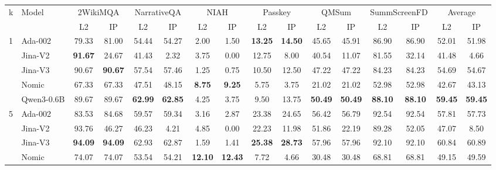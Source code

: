 \begin{sidewaystable}[htbp!]
\centering
\footnotesize
{}
\label{tab:detailed_nDCG}
\begin{tabular}{llcccccccccccccc}
\toprule
\multirow{2}{*}{k} & \multirow{2}{*}{Model} & \multicolumn{2}{c}{2WikiMQA} & \multicolumn{2}{c}{NarrativeQA} & \multicolumn{2}{c}{NIAH} & \multicolumn{2}{c}{Passkey} & \multicolumn{2}{c}{QMSum} & \multicolumn{2}{c}{SummScreenFD} & \multicolumn{2}{c}{Average} \\
\cmidrule(lr){3-4} \cmidrule(lr){5-6} \cmidrule(lr){7-8} \cmidrule(lr){9-10} \cmidrule(lr){11-12} \cmidrule(lr){13-14} \cmidrule(lr){15-16}
& & L2 & IP & L2 & IP & L2 & IP & L2 & IP & L2 & IP & L2 & IP & L2 & IP \\
\midrule
\multirow{5}{*}{1} & Ada-002 & 79.33 & 81.00 & 54.44 & 54.27 & 2.00 & 1.50 & \textbf{13.25} & \textbf{14.50} & 45.65 & 45.91 & 86.90 & 86.90 & 52.01 & 51.98 \\
& Jina-V2 & \textbf{91.67} & 24.67 & 41.43 & 2.32 & 3.75 & 0.00 & 12.75 & 8.00 & 40.54 & 11.07 & 81.55 & 32.14 & 41.48 & 4.66 \\
& Jina-V3 & 90.67 & \textbf{90.67} & 57.54 & 57.46 & 1.25 & 0.75 & 10.50 & 12.50 & 47.22 & 47.22 & 84.23 & 84.23 & 54.69 & 54.67 \\
& Nomic & 67.33 & 67.33 & 47.51 & 48.15 & \textbf{8.75} & \textbf{9.25} & 5.75 & 3.75 & 21.02 & 21.02 & 52.98 & 52.98 & 42.67 & 43.13 \\
& Qwen3-0.6B & 89.67 & 89.67 & \textbf{62.99} & \textbf{62.85} & 4.25 & 3.75 & 9.50 & 13.75 & \textbf{50.49} & \textbf{50.49} & \textbf{88.10} & \textbf{88.10} & \textbf{59.45} & \textbf{59.45} \\
\midrule
\multirow{5}{*}{5} & Ada-002 & 83.53 & 84.68 & 59.57 & 59.34 & 3.16 & 2.87 & 23.38 & 24.65 & 56.42 & 56.79 & 92.54 & 92.54 & 57.81 & 57.73 \\
& Jina-V2 & 93.76 & 46.27 & 46.23 & 4.21 & 4.85 & 0.00 & 22.23 & 11.98 & 51.86 & 22.19 & 89.28 & 52.05 & 47.07 & 8.50 \\
& Jina-V3 & \textbf{94.09} & \textbf{94.09} & 62.93 & 62.87 & 1.59 & 1.41 & \textbf{25.38} & \textbf{28.73} & 57.96 & 57.96 & 92.10 & 92.10 & 60.84 & 60.89 \\
& Nomic & 74.07 & 74.07 & 53.54 & 54.21 & \textbf{12.10} & \textbf{12.43} & 7.72 & 4.66 & 30.48 & 30.48 & 68.81 & 68.81 & 49.15 & 49.59 \\

\end{tabular}
\end{sidewaystable}
